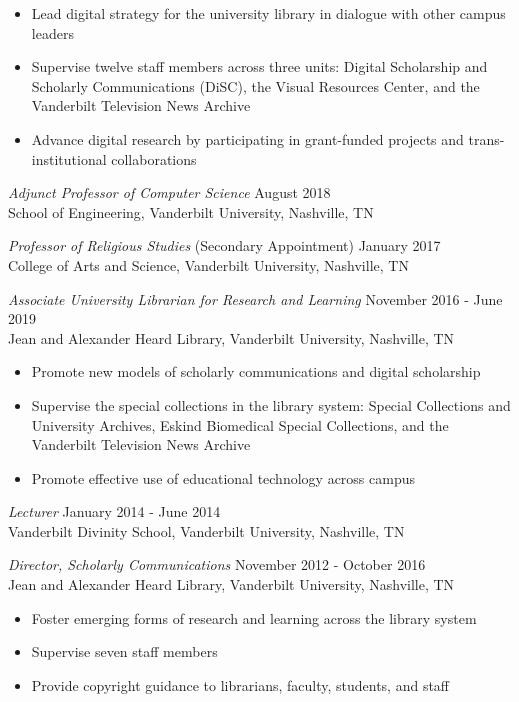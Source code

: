 \documentclass[10pt]{res} %
\begin{document}
\begin{resume}
\begin{itemize}
  \item Lead digital strategy for the university library in dialogue with other campus leaders
  \item Supervise twelve staff members across three units: Digital Scholarship and Scholarly Communications (DiSC), the Visual Resources Center, and the Vanderbilt Television News Archive
  \item Advance digital research by participating in grant-funded projects and trans-institutional collaborations
\end{itemize}

{\sl Adjunct Professor of Computer Science} \hfill August 2018 \\
School of Engineering, Vanderbilt University, Nashville, TN 

{\sl Professor of Religious Studies} (Secondary Appointment) \hfill January 2017 \\
College of Arts and Science, Vanderbilt University, Nashville, TN 

{\sl Associate University Librarian for Research and Learning} \hfill November 2016 - June 2019 \\
Jean and Alexander Heard Library, Vanderbilt University, Nashville, TN 

\begin{itemize}
    \item Promote new models of scholarly communications and digital scholarship
    \item Supervise the special collections in the library system: Special Collections and University Archives, Eskind Biomedical Special Collections, and the Vanderbilt Television News Archive
    \item Promote effective use of educational technology across campus 
\end{itemize}

{\sl Lecturer} \hfill January 2014 - June 2014 \\
Vanderbilt Divinity School, Vanderbilt University, Nashville, TN 

{\sl Director, Scholarly Communications} \hfill November 2012 - October 2016 \\
Jean and Alexander Heard Library, Vanderbilt University, Nashville, TN

\begin{itemize} 
    \item Foster emerging forms of research and learning across the library system
    \item Supervise seven staff members
    \item Provide copyright guidance to librarians, faculty, students, and staff
    

\end{itemize}
\end{resume}
\end{document}
